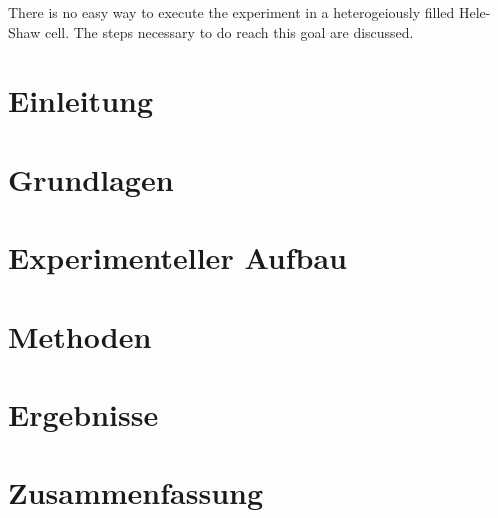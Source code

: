 \documentclass[twoside, a4paper, DIV=11,twocolumn]{book}
\begin{document}
  There is no easy way to execute the experiment in a heterogeiously filled Hele-Shaw cell. The steps necessary to do reach this goal are discussed.

\emptypage

\tableofcontents

\emptypage

\listoffigures

\newpage

\twocolumn
\balance %
\chapter{Einleitung}


\chapter{Grundlagen}


\chapter{Experimenteller Aufbau}


\chapter{Methoden}


\chapter{Ergebnisse}


% 

\chapter{Zusammenfassung}


\onecolumn



\end{document}
